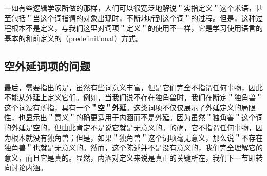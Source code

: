 一如有些逻辑学家所做的那样，人们可以很宽泛地解说＂实指定义＂这个术语，甚至包括＂当这个词指谓的对象出现时，不断地听到这个词＂的过程。但是，这种过程根本不是定义，与我们这里对词项＂定义＂的使用不一样，它是学习使用语言的基本的和前定义的（predefinitional）方式。

\subsection{空外延词项的问题}

最后，需要指出的是，虽然有些词意义丰富，但是它们完全不指谓任何事物，因此不能从外延上定义它们。例如，当我们说不存在独角兽时，我们在断定＂独角兽＂这个词没有所指，具有一个\textbf{＂空＂外延}。这类词项不仅仅展示了外延定义的局限性，也显示出＂意义＂的确更适用于内涵而不是外延。因为虽然＂独角兽＂这个词的外延是空的，但由此肯定不是说它就是无意义的。的确，它不指谓任何事物，因为根本就没有独角兽；但是，如果＂独角兽＂这个词项毫无意义，那么说＂不存在独角兽＂也就是无意义的。然而，这个陈述并不是没有意义的，我们完全理解它的意义，而且它是真的。显然，内涵对定义来说是真正的关键所在，我们下一节即转向讨论内涵。

